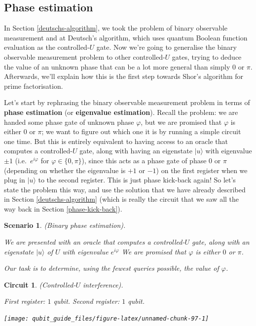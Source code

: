 \documentclass[fleqn,a4paper]{article}
\newtheorem*{scenario}{Scenario}
\newtheorem*{circuit}{Circuit}
\theoremstyle{definition}
\theoremstyle{definition}
\theoremstyle{definition}
\theoremstyle{definition}
\theoremstyle{remark}
\begin{document}
\hypertarget{phase-estimation}{%
\subsection{Phase estimation}\label{phase-estimation}}

In Section \ref{deutschs-algorithm}, we took the problem of binary observable measurement and at Deutsch's algorithm, which uses quantum Boolean function evaluation as the controlled-\(U\) gate.
Now we're going to generalise the binary observable measurement problem to other controlled-\(U\) gates, trying to deduce the value of an unknown phase that can be a lot more general than simply \(0\) or \(\pi\). Afterwards, we'll explain how this is the first step towards Shor's algorithm for prime factorisation.

Let's start by rephrasing the binary observable measurement problem in terms of \textbf{phase estimation} (or \textbf{eigenvalue estimation}).
Recall the problem: we are handed some phase gate of unknown phase \(\varphi\), but we are promised that \(\varphi\) is either \(0\) or \(\pi\); we want to figure out which one it is by running a simple circuit one time.
But this is entirely equivalent to having access to an oracle that computes a controlled-\(U\) gate, along with having an eigenstate \(|u\rangle\) with eigenvalue \(\pm1\) (i.e.~\(e^{i\varphi}\) for \(\varphi\in\{0,\pi\}\)), since this acts as a phase gate of phase \(0\) or \(\pi\) (depending on whether the eigenvalue is \(+1\) or \(-1\)) on the first register when we plug in \(|u\rangle\) to the second register.
This is just phase kick-back again!
So let's state the problem this way, and use the solution that we have already described in Section \ref{deutschs-algorithm} (which is really the circuit that we saw all the way back in Section \ref{phase-kick-back}).

\begin{scenario}

\emph{(Binary phase estimation).}

We are presented with an oracle that computes a controlled-\(U\) gate, along with an eigenstate \(|u\rangle\) of \(U\) with eigenvalue \(e^{i\varphi}\)
We are promised that \(\varphi\) is either \(0\) or \(\pi\).

Our task is to determine, using the fewest queries possible, the value of \(\varphi\).

\end{scenario}

\begin{circuit}

\emph{(Controlled-\(U\) interference).}

First register: \(1\) qubit. Second register: \(1\) qubit.

\begin{center}\texttt{[image: qubit\_guide\_files/figure-latex/unnamed-chunk-97-1]} \end{center}

\end{circuit}
\end{document}
